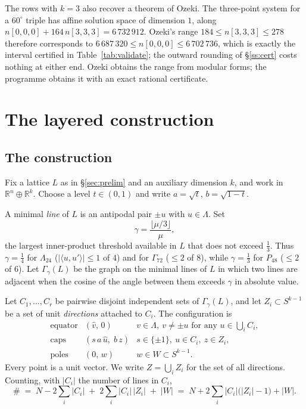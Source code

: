 \documentclass[11pt]{amsart}
\theoremstyle{remark}
\newcommand{\Leech}{\Lambda_{24}}
\newcommand{\Pff}{P_{48}}
\newcommand{\Gsz}{\Gamma_{72}}
\newcommand{\ip}[2]{\langle #1,#2\rangle}
\newcommand{\R}{\mathbb{R}}
\begin{document}
The rows with $k=3$ also recover a theorem of Ozeki. The three-point system for a
$60^\circ$ triple has affine solution space of dimension $1$, along
$n[0,0,0]+164\,n[3,3,3]=6\,732\,912$. Ozeki's range $184\le n[3,3,3]\le278$
\cite[Theorem 6.3]{ozeki2016} therefore corresponds to
$6\,687\,320\le n[0,0,0]\le6\,702\,736$, which is exactly the interval certified
in Table~\ref{tab:validate}; the outward rounding of \S\ref{ss:cert} costs
nothing at either end. Ozeki obtains the range from modular forms; the programme
obtains it with an exact rational certificate.

\section{The layered construction}\label{sec:cap}

\subsection{The construction}

Fix a lattice $L$ as in \S\ref{sec:prelim} and an auxiliary dimension $k$, and
work in $\R^{n}\oplus\R^{k}$. Choose a level $t\in(0,1)$ and write
$a=\sqrt t$, $b=\sqrt{1-t}$.

A minimal \emph{line} of $L$ is an antipodal pair $\pm u$ with $u\in\Lambda$. Set
\begin{equation}\label{eq:gamma}
  \gamma=\frac{\lfloor \mu/3\rfloor}{\mu},
\end{equation}
the largest inner-product threshold available in $L$ that does not exceed
$\tfrac13$. Thus $\gamma=\tfrac14$ for $\Leech$ ($|\ip{u}{u'}|\le1$ of $4$) and
for $\Gsz$ ($\le2$ of $8$), while $\gamma=\tfrac13$ for $\Pff$ ($\le2$ of $6$).
Let $\Gamma_\gamma(L)$ be the graph on the minimal lines of $L$ in which two
lines are adjacent when the cosine of the angle between them exceeds $\gamma$ in
absolute value.

Let $C_1,\dots,C_r$ be pairwise disjoint independent sets of $\Gamma_\gamma(L)$,
and let $Z_i\subset S^{k-1}$ be a set of unit \emph{directions} attached to
$C_i$. The configuration is
\begin{equation}\label{eq:families}
\begin{array}{lll}
  \text{equator} & (\hat v,\,0) & v\in\Lambda,\ v\ne\pm u \text{ for any } u\in\textstyle\bigcup_i C_i,\\[2pt]
  \text{caps}    & (s\,a\,\hat u,\; b\,z) & s\in\{\pm1\},\ u\in C_i,\ z\in Z_i,\\[2pt]
  \text{poles}   & (0,\,w) & w\in W\subset S^{k-1}.
\end{array}
\end{equation}
Every point is a unit vector. We write $Z=\bigcup_i Z_i$ for the set of all
directions. Counting,
with $|C_i|$ the number of lines in $C_i$,
\begin{equation}\label{eq:count}
  \#\;=\;N-2\sum_i|C_i|\;+\;2\sum_i|C_i|\,|Z_i|\;+\;|W|
  \;=\;N+2\sum_i|C_i|\bigl(|Z_i|-1\bigr)+|W| .
\end{equation}
\end{document}
